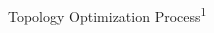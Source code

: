 \begin{frame}{Topology Optimization Process\textsuperscript{1}}
\begin{overlayarea}{\textwidth}{.8\textheight}
\end{overlayarea}
\end{frame}

%

